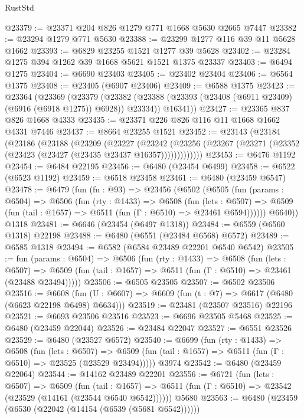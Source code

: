 \begin{lexlean}{RustStd}
\begin{coremodule}
@23379 := @23371 @204 @826 @1279 @771 @1668 @5630 @2665 @7447
@23382 := @23294 @1279 @771 @5630
@23388 := @23299 @1277 @116 @39 @11 @5628 @1662
@23393 := @6829 @23255 @1521 @1277 @39 @5628
@23402 := @23284 @1275 @394 @1262 @39 @1668 @5621 @1521 @1375 @23337
@23403 := @6494 @1275
@23404 := @6690 @23403
@23405 := @23402 @23404
@23406 := @6564 @1375
@23408 := @23405 (@6907 @23406)
@23409 := @6588 @1375
@23423 := @23364
    (@23369
      (@23379
        (@23382 (@23388 (@23393 (@23408 (@6911 @23409) (@6916 (@6918 @1275)) @6928)) @23334))
        @16341))
@23427 := @23365 @837 @826 @1668 @4333
@23435 := @23371 @226 @826 @116 @11 @1668 @1662 @4331 @7446
@23437 := @8664 @23255 @1521
@23452 := @23143
    (@23184
      (@23186
        (@23188
          (@23209
            (@23227
              (@23242
                (@23256 (@23267 (@23271 (@23352 (@23423 (@23427 (@23435 @23437 @16357)))))))))))))
@23453 := @6476 @1192
@23454 := @6484 @22195
@23456 := @6480 (@23454 @6499)
@23458 := @6522 (@6523 @1192)
@23459 := @6518 @23458
@23461 := @6480 (@23459 @6547)
@23478 := @6479
    (fun (fn : @93) =>
    @23456
      (@6502
        (@6505
          (fun (params : @6504) =>
          @6506
            (fun (rty : @1433) =>
            @6508
              (fun (lets : @6507) =>
              @6509 (fun (tail : @1657) => @6511 (fun (Γ : @6510) => @23461 @6594))))))
        @6640))
    @1318
@23481 := @6646 (@23454 (@6497 @1318))
@23484 := @6559 (@6560 @1318) @22198
@23488 := @6480 (@6551 (@23484 @6568) @6572)
@23489 := @6585 @1318
@23494 := @6582 (@6584 @23489 @22201 @6540 @6542)
@23505 := fun (params : @6504) =>
  @6506
    (fun (rty : @1433) =>
    @6508
      (fun (lets : @6507) =>
      @6509 (fun (tail : @1657) => @6511 (fun (Γ : @6510) => @23461 (@23488 @23494)))))
@23506 := @6505 @23505
@23507 := @6502 @23506
@23516 := @6608
    (fun (U : @6607) => @6609 (fun (t : @7) => @6617 (@6480 (@6623 @22198 @6498) @6634)))
@23519 := @23481 (@23507 @23516) @22196
@23521 := @6693 @23506 @23516
@23523 := @6696 @23505 @5468
@23525 := @6480 (@23459 @22044)
@23526 := @23484 @22047
@23527 := @6551 @23526
@23529 := @6480 (@23527 @6572)
@23540 := @6699
    (fun (rty : @1433) =>
    @6508
      (fun (lets : @6507) =>
      @6509 (fun (tail : @1657) => @6511 (fun (Γ : @6510) => @23525 (@23529 @23494)))))
    @3974
@23542 := @6480 (@23459 @22064)
@23544 := @14162 @23489 @22201
@23556 := @6721
    (fun (lets : @6507) =>
    @6509
      (fun (tail : @1657) =>
      @6511 (fun (Γ : @6510) => @23542 (@23529 (@14161 (@23544 @6540 @6542))))))
    @5680
@23563 := @6480 (@23459 (@6530 (@22042 (@14154 (@6539 (@5681 @6542))))))

\end{coremodule}
\end{lexlean}
